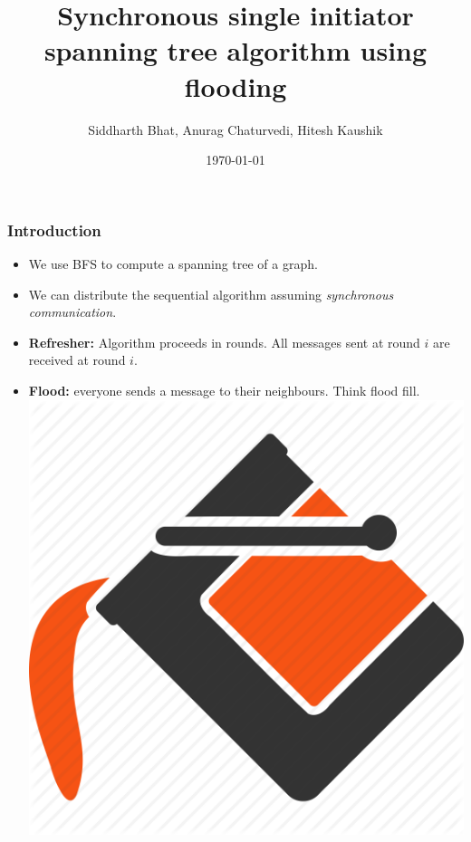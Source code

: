 \documentclass{beamer}
\title{Synchronous single initiator spanning tree algorithm using flooding}
\author{Siddharth Bhat, Anurag Chaturvedi, Hitesh Kaushik}
\date{\today}
\begin{document}
\begin{frame}
\titlepage
\end{frame}

\begin{frame}
    \frametitle{Introduction}
    \begin{itemize}
        \item We use BFS to compute a spanning tree of a graph. \pause
        \item We can distribute the sequential algorithm assuming \textit{synchronous communication}. \pause
        \item \textbf{Refresher:} Algorithm proceeds in rounds. All messages sent at round $i$ are received at round $i$. \pause
        \item \textbf{Flood:} everyone sends a message to their neighbours. Think flood fill.
            \includegraphics[width=0.05\paperwidth]{flood-fill.png}
    \end{itemize}
\end{frame}
\end{document}
